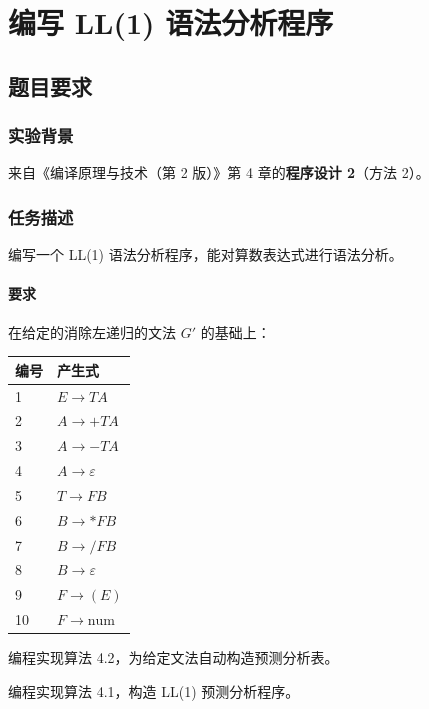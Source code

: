 \maketitle

\section{编写 LL(1) 语法分析程序}

\subsection{题目要求}

\subsubsection{实验背景}
来自《编译原理与技术（第 2 版）》第 4 章的\textbf{程序设计 2}（方法 2）。

\subsubsection{任务描述}

编写一个 LL(1) 语法分析程序，能对算数表达式进行语法分析。

\paragraph{要求}在给定的消除左递归的文法 $G'$ 的基础上：
\begin{table}[htbp]
    \centering
    \begin{tabular}{@{}ll@{}}
        \toprule
        编号 & 产生式                   \\ \midrule
        1  & $E \to TA $           \\
        2  & $A \to +TA$           \\
        3  & $A \to -TA$           \\
        4  & $A \to ε  $           \\
        5  & $T \to FB $           \\
        6  & $B \to *FB$           \\
        7  & $B \to /FB$           \\
        8  & $B \to \varepsilon  $ \\
        9  & $F \to (E)$           \\
        10 & $F \to \text{num}$    \\
        \bottomrule
    \end{tabular}
\end{table}
\begin{compactenum}
    \item 编程实现算法 4.2，为给定文法自动构造预测分析表。
    \item 编程实现算法 4.1，构造 LL(1) 预测分析程序。
\end{compactenum}

